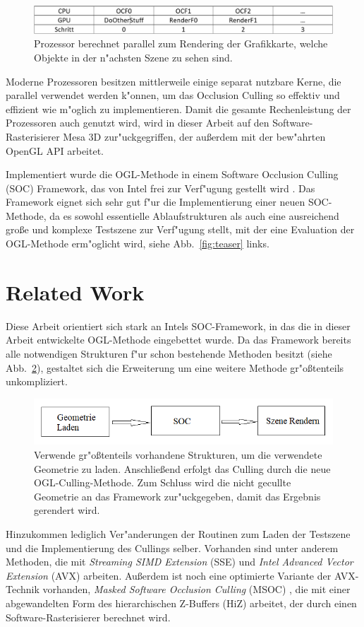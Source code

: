 \documentclass[journal]{vgtc}
\begin{document}
\begin{figure}%
\includegraphics[width=\columnwidth]{images/Ablauf.PNG}%
\caption{Prozessor berechnet parallel zum Rendering der Grafikkarte, welche Objekte in der n"achsten Szene zu sehen sind.}%
\label{fig:ablauf}%
\end{figure}

Moderne Prozessoren besitzen mittlerweile einige separat nutzbare Kerne, die parallel verwendet werden k"onnen, um das Occlusion Culling so effektiv und effizient wie m"oglich zu implementieren. Damit die gesamte Rechenleistung der Prozessoren auch genutzt wird, wird in dieser Arbeit auf den Software-Rasterisierer Mesa 3D zur"uckgegriffen, der au{\ss}erdem mit der bew"ahrten OpenGL API arbeitet. 

Implementiert wurde die OGL-Methode in einem Software Occlusion Culling (SOC) Framework, das von Intel frei zur Verf"ugung gestellt wird \cite{SOCF}. Das Framework eignet sich sehr gut f"ur die Implementierung einer neuen SOC-Methode, da es sowohl essentielle Ablaufstrukturen als auch eine ausreichend gro{\ss}e und komplexe Testszene zur Verf"ugung stellt, mit der eine Evaluation der OGL-Methode erm"oglicht wird, siehe Abb.\ \ref{fig:teaser} links.


\section{Related Work}
Diese Arbeit orientiert sich stark an Intels SOC-Framework, in das die in dieser Arbeit entwickelte OGL-Methode eingebettet wurde. Da das Framework bereits alle notwendigen Strukturen f"ur schon bestehende Methoden besitzt (siehe Abb.\ \ref{fig:ablaufframework}), gestaltet sich die Erweiterung um eine weitere Methode gr"o{\ss}tenteils unkompliziert. 
\begin{figure}%
\includegraphics[width=\columnwidth]{images/AblaufFramework.png}%
\caption{Verwende gr"o{\ss}tenteils vorhandene Strukturen, um die verwendete Geometrie zu laden. Anschlie{\ss}end erfolgt das Culling durch die neue OGL-Culling-Methode. Zum Schluss wird die nicht gecullte Geometrie an das Framework zur"uckgegeben, damit das Ergebnis gerendert wird.}%
\label{fig:ablaufframework}%
\end{figure}
Hinzukommen lediglich Ver"anderungen der Routinen zum Laden der Testszene und die Implementierung des Cullings selber. Vorhanden sind unter anderem Methoden, die mit \textit{Streaming SIMD Extension} (SSE) und \textit{Intel Advanced Vector Extension} (AVX) arbeiten. Au{\ss}erdem ist noch eine optimierte Variante der AVX-Technik vorhanden, \textit{Masked Software Occlusion Culling} (MSOC) \cite{MSOC}, die mit einer abgewandelten Form des hierarchischen Z-Buffers (HiZ) \cite{HiZ} arbeitet, der durch einen Software-Rasterisierer berechnet wird.
\end{document}
